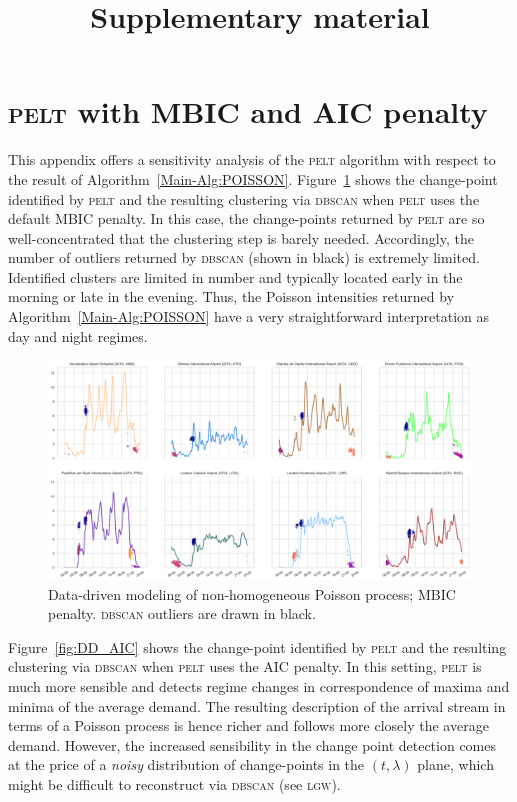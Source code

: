 \documentclass[]{elsarticle}
\newcommand{\PELT}{\textsc{pelt}}
\newcommand{\DBSCAN}{\textsc{dbscan}}
\newcommand{\airp}[1]{\textcolor{#1}{\textsc{#1}}}
\begin{document}
\begin{frontmatter}

\title{Supplementary material}

\end{frontmatter}

\appendix

\section{\PELT{} with \acs{MBIC} and \acs{AIC} penalty}\label{sec:appa}

  This appendix offers a sensitivity analysis of the \PELT{} algorithm with respect to the result of Algorithm~\ref{Main-Alg:POISSON}.
  Figure~\ref{fig:DD_MBIC} shows the change-point identified by \PELT{} and the resulting clustering via \DBSCAN{} when \PELT{} uses the default \ac{MBIC} penalty.
  In this case, the change-points returned by \PELT{} are so well-concentrated that the clustering step is barely needed.
  Accordingly, the number of outliers returned by \DBSCAN{} (shown in black) is extremely limited.
  Identified clusters are limited in number and typically located early in the morning or late in the evening.
  Thus, the Poisson intensities returned by Algorithm~\ref{Main-Alg:POISSON} have a very straightforward interpretation as day and night regimes.

  \begin{figure}
      \includegraphics[width=\textwidth]{DDPoisson_MBIC}
      \caption{Data-driven modeling of non-homogeneous Poisson process; \ac{MBIC} penalty. \DBSCAN{} outliers are drawn in black.}\label{fig:DD_MBIC}
  \end{figure}

  Figure~\ref{fig:DD_AIC} shows the change-point identified by \PELT{} and the resulting clustering via \DBSCAN{} when \PELT{} uses the \ac{AIC} penalty.
  In this setting, \PELT{} is much more sensible and detects regime changes in correspondence of maxima and minima of the average demand.
  The resulting description of the arrival stream in terms of a Poisson process is hence richer and follows more closely the average demand.
  However, the increased sensibility in the change point detection comes at the price of a \emph{noisy} distribution of change-points in the \((t,\lambda)\) plane, which might be difficult to reconstruct via \DBSCAN{} (see \airp{lgw}).
\end{document}

